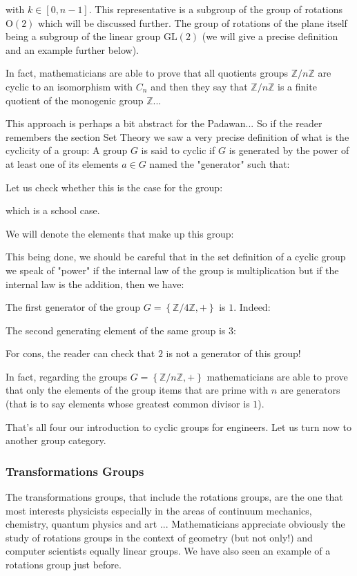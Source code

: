 	with $k\in[0,n-1]$. This representative is a subgroup of the group of rotations $\text{O}(2)$ which will be discussed further. The group of rotations of the plane itself being a subgroup of the linear group $\text{GL}(2)$ (we will give a precise definition and an example further below).
	
	In fact, mathematicians are able to prove that all quotients groups $\mathbb{Z}/n\mathbb{Z}$ are cyclic to an isomorphism with $C_n$ and then they say that $\mathbb{Z}/n\mathbb{Z}$ is a finite quotient of the monogenic group $\mathbb{Z}$...
	
	This approach is perhaps a bit abstract for the Padawan... So if the reader remembers the section Set Theory we saw a very precise definition of what is the cyclicity of a group: A group $G$ is said to cyclic if $G$ is generated by the power of at least one of its elements $a\in G$ named the "generator" such that:
	
	Let us check whether this is the case for the group:
	
	which is a school case.
	
	We will denote the elements that make up this group:
	
	This being done, we should be careful that in the set definition of a cyclic group we speak of "power" if the internal law of the group is multiplication but if the internal law is the addition, then we have:
	
	The first generator of the group $G=\left\lbrace \mathbb{Z}/4\mathbb{Z},+ \right\rbrace$ is $1$. Indeed:
	
	The second generating element of the same group is $3$:
	
	For cons, the reader can check that $2$ is not a generator of this group!
	
	In fact, regarding the groups $G=\left\lbrace \mathbb{Z}/n\mathbb{Z},+ \right\rbrace$ mathematicians are able to prove that only the elements of the group items that are prime with $n$ are generators (that is to say elements whose greatest common divisor is $1$).
	
	That's all four our introduction to cyclic groups for engineers. Let us turn now to another group category.
	
	\subsubsection{Transformations Groups}
	The transformations groups, that include the rotations groups, are the one that most interests physicists especially in the areas of continuum mechanics, chemistry, quantum physics and art ... Mathematicians appreciate obviously the study of rotations groups in the context of geometry (but not only!) and computer scientists equally linear groups. We have also seen an example of a rotations group just before.
	
